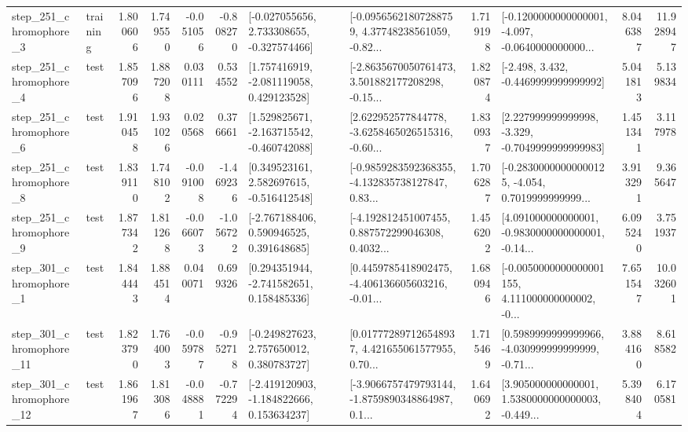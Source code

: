 \begin{tabular}{llrrrrllrlrr}
   step\_251\_chromophore\_3 &  training &      1.800606 &    1.749550 &     -0.051056 & -0.808270 &   [-0.027055656, 2.733308655, -0.327574466] &  [-0.09565621807288759, 4.37748238561059, -0.82... &       1.719198 &  [-0.1200000000000001, -4.097, -0.0640000000000... &            8.046387 &         11.928947 \\
   step\_251\_chromophore\_4 &      test &      1.857096 &    1.887208 &      0.030111 &  0.534552 &    [1.757416919, -2.081119058, 0.429123528] &  [-2.8635670050761473, 3.501882177208298, -0.15... &       1.820874 &               [-2.498, 3.432, -0.4469999999999992] &            5.041813 &          5.139834 \\
   step\_251\_chromophore\_6 &      test &      1.910458 &    1.931026 &      0.020568 &  0.376661 &   [1.529825671, -2.163715542, -0.460742088] &  [2.622952577844778, -3.6258465026515316, -0.60... &       1.830937 &   [2.227999999999998, -3.329, -0.7049999999999983] &            1.451341 &          3.117978 \\
   step\_251\_chromophore\_8 &      test &      1.839110 &    1.748102 &     -0.091008 & -1.469236 &    [0.349523161, 2.582697615, -0.516412548] &  [-0.9859283592368355, -4.132835738127847, 0.83... &       1.706287 &  [-0.28300000000000125, -4.054, 0.7019999999999... &            3.913291 &          9.365647 \\
   step\_251\_chromophore\_9 &      test &      1.877342 &    1.811268 &     -0.066073 & -1.056722 &    [-2.767188406, 0.590946525, 0.391648685] &  [-4.192812451007455, 0.887572299046308, 0.4032... &       1.456202 &  [4.091000000000001, -0.9830000000000001, -0.14... &            6.095240 &          3.751937 \\
   step\_301\_chromophore\_1 &      test &      1.844443 &    1.884514 &      0.040071 &  0.699326 &    [0.294351944, -2.741582651, 0.158485336] &  [0.4459785418902475, -4.406136605603216, -0.01... &       1.680946 &  [-0.0050000000000001155, 4.111000000000002, -0... &            7.651547 &         10.032601 \\
  step\_301\_chromophore\_11 &      test &      1.823790 &    1.764003 &     -0.059787 & -0.952718 &    [-0.249827623, 2.757650012, 0.380783727] &  [0.017772897126548937, 4.421655061577955, 0.70... &       1.715469 &  [0.5989999999999966, -4.030999999999999, -0.71... &            3.884160 &          8.618582 \\
  step\_301\_chromophore\_12 &      test &      1.861967 &    1.813086 &     -0.048881 & -0.772294 &   [-2.419120903, -1.184822666, 0.153634237] &  [-3.9066757479793144, -1.8759890348864987, 0.1... &       1.640692 &  [3.905000000000001, 1.5380000000000003, -0.449... &            5.398404 &          6.170581 \\

\end{tabular}
